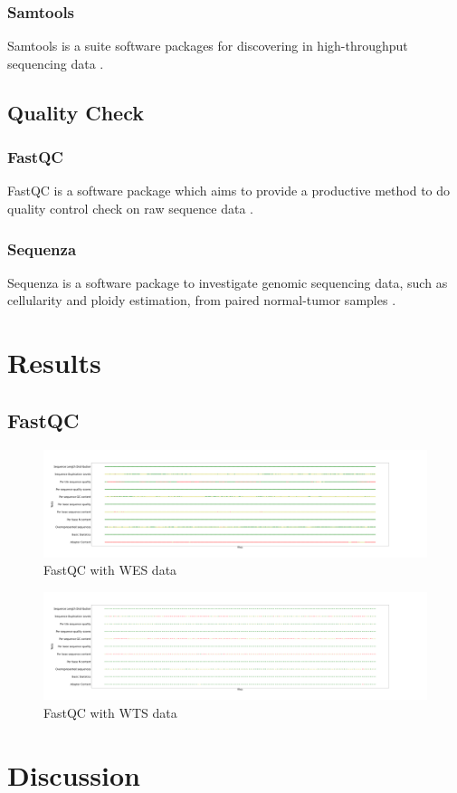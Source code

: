 \documentclass[a4paper]{article}
\begin{document}
            \subsubsection{Samtools}
                Samtools is a suite software packages for discovering in high-throughput sequencing data \cite{samtools1}.

        \subsection{Quality Check}
            \subsubsection{FastQC}
                FastQC is a software package which aims to provide a productive method to do quality control check on raw sequence data \cite{fastqc1}.

            \subsubsection{Sequenza}
                Sequenza is a software package to investigate genomic sequencing data, such as cellularity and ploidy estimation, from paired normal-tumor samples \cite{sequenza1}.

    \section{Results}
        \subsection{FastQC}

            \begin{figure}[p]
                \centering
                \includegraphics[width=0.8 \linewidth]{figures/FastQC/FastQC_WES.png}
                \caption{FastQC with WES data}
                \label{fig:fastqc-wes}
            \end{figure}

            \begin{figure}[p]
                \centering
                \includegraphics[width=0.8 \linewidth]{figures/FastQC/FastQC_WTS.png}
                \caption{FastQC with WTS data}
                \label{fig:fastqc-wts}
            \end{figure}

    \section{Discussion}

    
    
\end{document}
